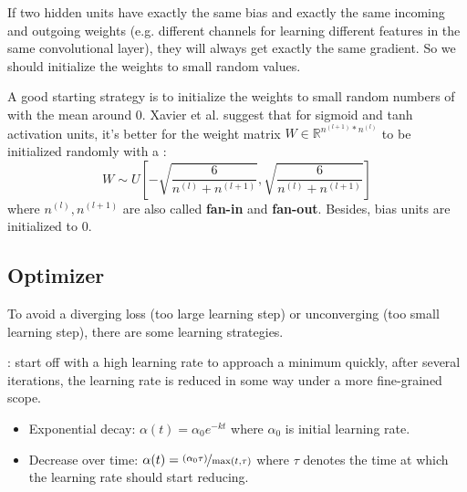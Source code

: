 If two hidden units have exactly the same bias and exactly the same incoming and outgoing weights (e.g. different channels for learning different features in the same convolutional layer), they will always get exactly the same gradient.
So we should initialize the weights to small random values.

A good starting strategy is to initialize the weights to small random numbers of  with the mean around $0$.
Xavier et al.  suggest that for sigmoid and tanh activation units, it's better for the weight matrix $W \in \mathbb{R}^{n^{(l+1)} * n^{(l)}}$ to be initialized randomly with a :
\begin{equation}
W \sim U\left[- \sqrt{\frac{6}{n^{(l)} + n^{(l+1)}}}, \sqrt{\frac{6}{n^{(l)} + n^{(l+1)}}}\right]
\end{equation}
where $n^{(l)}, n^{(l+1)}$ are also called \textbf{fan-in} and \textbf{fan-out}.
Besides, bias units are initialized to $0$.

\subsection{Optimizer}
To avoid a diverging loss (too large learning step) or unconverging (too small learning step), there are some learning strategies.

: start off with a high learning rate to approach a minimum quickly, after several iterations, the learning rate is reduced in some way under a more fine-grained scope.
\begin{itemize}
	\item Exponential decay: $\alpha(t) = \alpha_0 e^{-kt}$ where $\alpha_0$ is initial learning rate.
	\item Decrease over time: $\alpha(t) = \nicefrac{(\alpha_0 \tau)}{\max(t, \tau)}$ where $\tau$ denotes the time at which the learning rate should start reducing.
\end{itemize}


